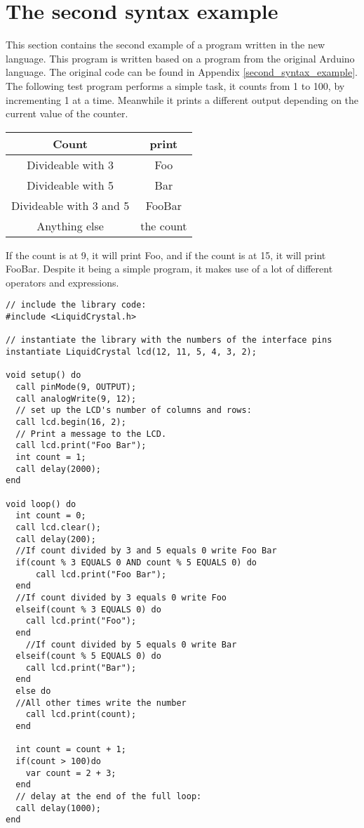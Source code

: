 \section{The second syntax example}
This section contains the second example of a program written in the new language. This program is written based on a program from the original Arduino language. The original code can be found in Appendix \ref{second_syntax_example}. The following test program performs a simple task,
it counts from 1 to 100, by incrementing 1 at a time. Meanwhile it prints a different output depending on the current value of the counter.\\
\begin{table}[H]
\centering
\begin{tabular}{|c|c|}
\hline 
Count & print \\ 
\hline 
Divideable with 3 & Foo \\ 
\hline 
Divideable with 5 & Bar \\ 
\hline 
Divideable with 3 and 5 & FooBar \\ 
\hline 
Anything else & the count \\ 
\hline 
\end{tabular} 
\end{table}

If the count is at 9, it will print Foo, and if the count is at 15, it will print FooBar. Despite it being a simple program, it makes use of a lot of different operators and expressions.

\begin{lstlisting}[caption=LCD code example based on the source language, label=lst:syntax2]
// include the library code:
#include <LiquidCrystal.h>

// instantiate the library with the numbers of the interface pins
instantiate LiquidCrystal lcd(12, 11, 5, 4, 3, 2);

void setup() do
  call pinMode(9, OUTPUT);
  call analogWrite(9, 12);
  // set up the LCD's number of columns and rows: 
  call lcd.begin(16, 2);
  // Print a message to the LCD.
  call lcd.print("Foo Bar");
  int count = 1;
  call delay(2000);
end

void loop() do
  int count = 0;
  call lcd.clear();
  call delay(200);
  //If count divided by 3 and 5 equals 0 write Foo Bar
  if(count % 3 EQUALS 0 AND count % 5 EQUALS 0) do
      call lcd.print("Foo Bar"); 
  end
  //If count divided by 3 equals 0 write Foo 
  elseif(count % 3 EQUALS 0) do
    call lcd.print("Foo");
  end
    //If count divided by 5 equals 0 write Bar 
  elseif(count % 5 EQUALS 0) do
    call lcd.print("Bar");
  end
  else do
  //All other times write the number
    call lcd.print(count);
  end
  
  int count = count + 1;
  if(count > 100)do
    var count = 2 + 3;
  end
  // delay at the end of the full loop:
  call delay(1000);
end
\end{lstlisting}
